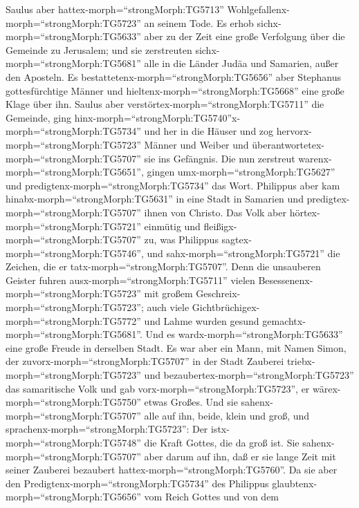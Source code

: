  Saulus aber hattex-morph=``strongMorph:TG5713''
Wohlgefallenx-morph=``strongMorph:TG5723'' an seinem Tode. Es erhob
sichx-morph=``strongMorph:TG5633'' aber zu der Zeit eine große
Verfolgung über die Gemeinde zu Jerusalem; und sie zerstreuten
sichx-morph=``strongMorph:TG5681'' alle in die Länder Judäa und
Samarien, außer den Aposteln.  Es
bestattetenx-morph=``strongMorph:TG5656'' aber Stephanus gottesfürchtige
Männer und hieltenx-morph=``strongMorph:TG5668'' eine große Klage über
ihn.  Saulus aber verstörtex-morph=``strongMorph:TG5711''
die Gemeinde, ging
hinx-morph=``strongMorph:TG5740''\textbar x-morph=``strongMorph:TG5734''
und her in die Häuser und zog hervorx-morph=``strongMorph:TG5723''
Männer und Weiber und überantwortetex-morph=``strongMorph:TG5707'' sie
ins Gefängnis.  Die nun zerstreut
warenx-morph=``strongMorph:TG5651'', gingen
umx-morph=``strongMorph:TG5627'' und
predigtenx-morph=``strongMorph:TG5734'' das Wort.  Philippus
aber kam hinabx-morph=``strongMorph:TG5631'' in eine Stadt in Samarien
und predigtex-morph=``strongMorph:TG5707'' ihnen von Christo.
 Das Volk aber hörtex-morph=``strongMorph:TG5721'' einmütig
und fleißigx-morph=``strongMorph:TG5707'' zu, was Philippus
sagtex-morph=``strongMorph:TG5746'', und
sahx-morph=``strongMorph:TG5721'' die Zeichen, die er
tatx-morph=``strongMorph:TG5707''.  Denn die unsauberen
Geister fuhren ausx-morph=``strongMorph:TG5711'' vielen
Besessenenx-morph=``strongMorph:TG5723'' mit großem
Geschreix-morph=``strongMorph:TG5723''; auch viele
Gichtbrüchigex-morph=``strongMorph:TG5772'' und Lahme wurden gesund
gemachtx-morph=``strongMorph:TG5681''.  Und es
wardx-morph=``strongMorph:TG5633'' eine große Freude in derselben Stadt.
 Es war aber ein Mann, mit Namen Simon, der
zuvorx-morph=``strongMorph:TG5707'' in der Stadt Zauberei
triebx-morph=``strongMorph:TG5723'' und
bezaubertex-morph=``strongMorph:TG5723'' das samaritische Volk und gab
vorx-morph=``strongMorph:TG5723'', er wärex-morph=``strongMorph:TG5750''
etwas Großes.  Und sie sahenx-morph=``strongMorph:TG5707''
alle auf ihn, beide, klein und groß, und
sprachenx-morph=``strongMorph:TG5723'': Der
istx-morph=``strongMorph:TG5748'' die Kraft Gottes, die da groß ist.
 Sie sahenx-morph=``strongMorph:TG5707'' aber darum auf
ihn, daß er sie lange Zeit mit seiner Zauberei bezaubert
hattex-morph=``strongMorph:TG5760''.  Da sie aber den
Predigtenx-morph=``strongMorph:TG5734'' des Philippus
glaubtenx-morph=``strongMorph:TG5656'' vom Reich Gottes und von dem
